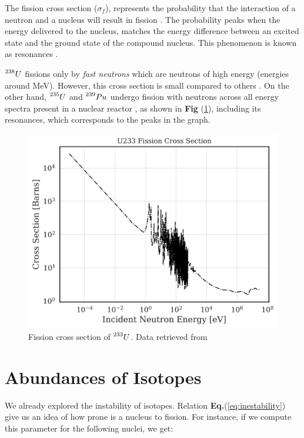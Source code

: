  The fission cross section ($\sigma_{f}$), represents the probability that the interaction of a neutron and a nucleus will result in fission \cite{Stacey_2010}. The probability peaks when the energy delivered to the nucleus, matches the energy difference between an excited state and the ground state of the compound nucleus. This phenomenon is known as resonances \cite{Stacey_2010}. 

$\prescript{238}{}{U}$ fissions only by \textit{fast neutrons} which are neutrons of high energy (energies around MeV). However, this cross section is small compared to others \cite{Notas_sanabricas}. On the other hand, $\prescript{235}{}{U}$ and $\prescript{239}{}{Pu}$ undergo fission with neutrons across all energy spectra present in a nuclear reactor \cite{Notas_sanabricas}, as shown in \textbf{Fig} (\ref{fig:Cross_section_fission}), including its resonances, which corresponds to the peaks in the graph.

\begin{figure}
    \centering
    \includegraphics[width=0.75\linewidth]{Kap2/Figures/U233_Cross_Section.png}
    \caption{Fission cross section of $\prescript{233}{}{U}$. Data retrieved from \cite{NNDC}}
    \label{fig:Cross_section_fission}
\end{figure}

\section{Abundances of Isotopes}
\label{sec:possible_fuels}

We already explored the instability of isotopes. Relation \textbf{Eq.}(\ref{eq:inestability}) give us an idea of how prone is a nucleus to fission. For instance, if we compute this parameter for the following nuclei, we get:

